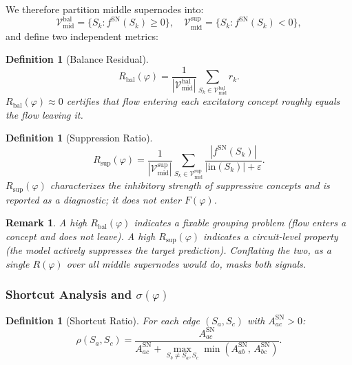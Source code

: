 \documentclass[11pt]{article}
\newtheorem{definition}[theorem]{Definition}
\newtheorem{remark}[theorem]{Remark}
\newcommand{\cV}{\mathcal{V}}
\newcommand{\1}{\mathbbm{1}}
\newcommand{\eps}{\varepsilon}
\newcommand{\Rbal}{R_{\mathrm{bal}}(\varphi)}
\newcommand{\Rsup}{R_{\mathrm{sup}}(\varphi)}
\newcommand{\Fphi}{F(\varphi)}
\begin{document}
We therefore partition middle supernodes into:
\[
  \cV^{\mathrm{bal}}_{\mathrm{mid}} = \{S_k : f^{\mathrm{SN}}(S_k) \ge 0\}, \quad
  \cV^{\mathrm{sup}}_{\mathrm{mid}} = \{S_k : f^{\mathrm{SN}}(S_k) < 0\},
\]
and define two independent metrics:

\begin{definition}[Balance Residual]
  \begin{equation}
    \Rbal = \frac{1}{|\cV^{\mathrm{bal}}_{\mathrm{mid}}|} \sum_{S_k \in \cV^{\mathrm{bal}}_{\mathrm{mid}}} r_k.
    \label{eq:R-bal}
  \end{equation}
  $\Rbal \approx 0$ certifies that flow entering each excitatory concept roughly equals the flow leaving it.
\end{definition}

\begin{definition}[Suppression Ratio]
  \begin{equation}
    \Rsup = \frac{1}{|\cV^{\mathrm{sup}}_{\mathrm{mid}}|} \sum_{S_k \in \cV^{\mathrm{sup}}_{\mathrm{mid}}} \frac{|f^{\mathrm{SN}}(S_k)|}{|\mathrm{in}(S_k)| + \eps}.
    \label{eq:R-sup}
  \end{equation}
  $\Rsup$ characterizes the inhibitory strength of suppressive concepts and is reported as a diagnostic; it does not enter $\Fphi$.
\end{definition}

\begin{remark}
  A high $\Rbal$ indicates a fixable grouping problem (flow enters a concept and does not leave).
  A high $\Rsup$ indicates a circuit-level property (the model actively suppresses the target prediction).
  Conflating the two, as a single $R(\varphi)$ over all middle supernodes would do, masks both signals.
\end{remark}

\subsubsection{Shortcut Analysis and $\sigma(\varphi)$}
\label{sec:shortcuts}

\begin{definition}[Shortcut Ratio]
  For each edge $(S_a, S_c)$ with $A^{\mathrm{SN}}_{ac} > 0$:
  \begin{equation}
    \rho(S_a, S_c) = \frac{A^{\mathrm{SN}}_{ac}}{A^{\mathrm{SN}}_{ac} + \displaystyle\max_{S_b \ne S_a, S_c} \min\!\left(A^{\mathrm{SN}}_{ab},\, A^{\mathrm{SN}}_{bc}\right)}.
    \label{eq:shortcut-ratio}
  \end{equation}
\end{definition}
\end{document}
